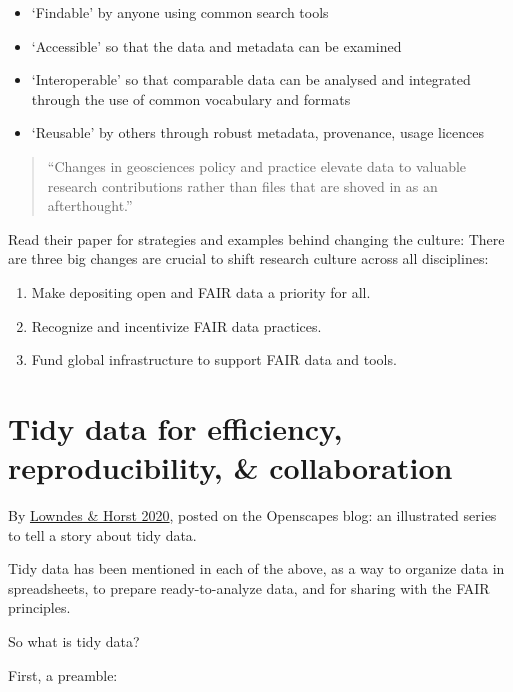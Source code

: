 \documentclass[
  letterpaper,
  DIV=11,
  numbers=noendperiod]{scrreprt}
\providecommand{\tightlist}{%
  \setlength{\itemsep}{0pt}\setlength{\parskip}{0pt}}
\begin{document}
\begin{itemize}
\tightlist
\item
  `Findable' by anyone using common search tools
\item
  `Accessible' so that the data and metadata can be examined
\item
  `Interoperable' so that comparable data can be analysed and integrated
  through the use of common vocabulary and formats
\item
  `Reusable' by others through robust metadata, provenance, usage
  licences
\end{itemize}

\begin{quote}
``Changes in geosciences policy and practice elevate data to valuable
research contributions rather than files that are shoved in as an
afterthought.''
\end{quote}

Read their paper for strategies and examples behind changing the
culture: There are three big changes are crucial to shift research
culture across all disciplines:

\begin{enumerate}
\def\labelenumi{\arabic{enumi}.}
\tightlist
\item
  Make depositing open and FAIR data a priority for all.
\item
  Recognize and incentivize FAIR data practices.
\item
  Fund global infrastructure to support FAIR data and tools.
\end{enumerate}

\hypertarget{tidy-data-for-efficiency-reproducibility-collaboration}{%
\section{Tidy data for efficiency, reproducibility, \&
collaboration}\label{tidy-data-for-efficiency-reproducibility-collaboration}}

By \href{https://www.openscapes.org/blog/2020/10/12/tidy-data/}{Lowndes
\& Horst 2020}, posted on the Openscapes blog: an illustrated series to
tell a story about tidy data.

Tidy data has been mentioned in each of the above, as a way to organize
data in spreadsheets, to prepare ready-to-analyze data, and for sharing
with the FAIR principles.

So what is tidy data?

First, a preamble:
\end{document}
